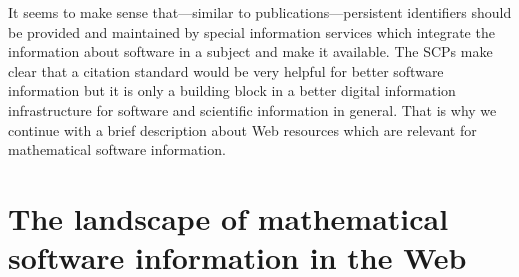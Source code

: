 \documentclass[12pt]{article}
\begin{document}
It seems to make sense that---similar to publications---persistent identifiers should be provided and maintained by special information services which integrate the information about software in a subject and make it available.  The SCPs make clear that a citation standard would be very helpful for better software information but it is only a building block in a better digital information infrastructure for software and scientific information in general. That is why we continue with a brief description about Web resources which are relevant for mathematical software information.


\section{The landscape of mathematical software information in the Web}
\end{document}

